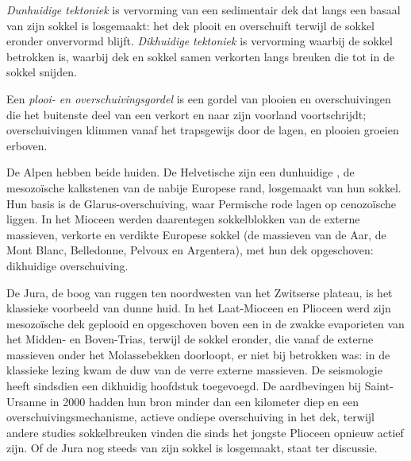 \begin{definition}\label{def:b2:alpine-orogen:skin}
\emph{Dunhuidige tektoniek} is vervorming van een
sedimentair dek dat langs een basaal  van zijn sokkel is losgemaakt: het dek plooit en
overschuift terwijl de sokkel eronder onvervormd blijft. \emph{Dikhuidige
tektoniek} is vervorming waarbij de sokkel betrokken is,
waarbij dek en sokkel samen verkorten langs breuken die tot in de sokkel snijden.
\end{definition}

\begin{definition}\label{def:b2:alpine-orogen:ftb}
Een \emph{plooi- en overschuivingsgordel} is een gordel van plooien en overschuivingen
die het buitenste deel van een  verkort en naar zijn voorland voortschrijdt; overschuivingen
klimmen vanaf het  trapsgewijs door de lagen, en plooien groeien erboven.
\end{definition}

De Alpen hebben beide huiden. De Helvetische  zijn een dunhuidige , de
mesozoïsche kalkstenen van de nabije Europese rand, losgemaakt van hun sokkel. Hun basis is
de Glarus-overschuiving, waar Permische rode lagen op cenozoïsche  liggen. In het Mioceen werden
daarentegen sokkelblokken van de externe massieven, verkorte en verdikte Europese sokkel (de massieven van de
Aar, de Mont Blanc, Belledonne, Pelvoux en Argentera), met hun
dek opgeschoven: dikhuidige overschuiving.

De Jura, de boog van ruggen ten noordwesten van het Zwitserse plateau, is het klassieke voorbeeld van dunne
huid. In het Laat-Mioceen en Plioceen werd zijn mesozoïsche dek geplooid en opgeschoven boven een
 in de zwakke evaporieten van het Midden- en Boven-Trias, terwijl de sokkel eronder,
die vanaf de externe massieven onder het Molassebekken doorloopt, er niet bij betrokken was: in
de klassieke lezing kwam de duw van de verre externe massieven. De seismologie heeft sindsdien
een dikhuidig hoofdstuk toegevoegd. De aardbevingen bij Saint-Ursanne in 2000 hadden hun bron
minder dan een kilometer diep en een overschuivingsmechanisme, actieve ondiepe overschuiving in het dek,
terwijl andere studies sokkelbreuken vinden die sinds het jongste Plioceen opnieuw actief zijn. Of
de Jura nog steeds van zijn sokkel is losgemaakt, staat ter discussie.

